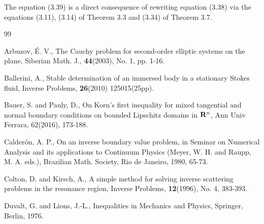 The equation (3.39) is a direct consequence of rewriting equation (3.38) via the equations
(3.11),  (3.14) of Theorem 3.3  and (3.34) of Theorem 3.7.


















\begin{thebibliography}{99}







  Arbuzov, \'E. V.,
                  The Cauchy problem for second-order elliptic systems on the plane,
                  Siberian Math. J., {\bf 44}(2003), No. 1, pp. 1-16.





 Ballerini, A.,
               Stable determination of an immersed body in a stationary Stokes fluid,
               Inverse Problems, {\bf 26}(2010) 125015(25pp).





  Bauer, S. and Pauly, D.,  
                On Korn's first inequality for mixed tangential and normal boundary conditions on bounded Lipschitz  domains 
                in $\Bbb R^n$, 
                Ann Univ Ferrara, 62(2016), 173-188.


             



 Calder\'on, A. P.,
              On an inverse boundary value problem, in Seminar on Numerical Analysis and its applications to Continuum 
              Physics (Meyer, W. H. and Raupp, M. A. eds.),
              Brazilian Math. Society, Rio de Janeiro, 1980, 65-73.







  Colton, D. and Kirsch, A.,
           \newblock A simple method for solving inverse scattering problems in the resonance region, 
           \newblock Inverse Problems, {\bf 12}(1996), No. 4, 383-393.




 Duvalt, G. and Lions, J.-L.,
            Inequalities in Mechanics and Physics, Springer, Berlin, 1976.







\end{thebibliography}
